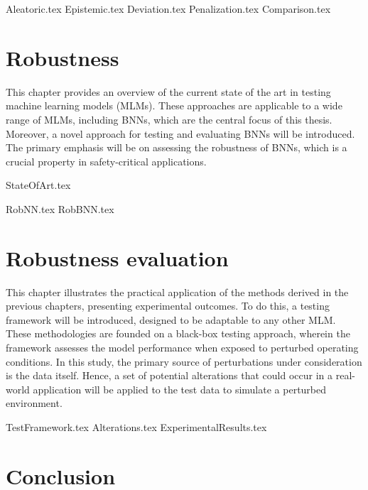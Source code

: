 \documentclass[
	12pt,
	a4paper,
	cleardoublepage=empty,
	headings=twolinechapter,
	numbers=autoenddot,
]{scrbook}
\begin{document}
	{Aleatoric.tex}
	{Epistemic.tex}
	{Deviation.tex}
	{Penalization.tex}
	{Comparison.tex}
	
	\chapter{Robustness}\label{chap:c4}
	
	This chapter provides an overview of the current state of the art in testing machine learning models (MLMs). These approaches are applicable to a wide range of MLMs, including BNNs, which are the central focus of this thesis. Moreover, a novel approach for testing and evaluating BNNs will be introduced. The primary emphasis will be on assessing the robustness of BNNs, which is a crucial property in safety-critical applications.
	
	{StateOfArt.tex}
	
	{RobNN.tex}
	{RobBNN.tex}
	
	\chapter{Robustness evaluation}\label{chap:c5}
	
	This chapter illustrates the practical application of the methods derived in the previous chapters, presenting experimental outcomes. To do this, a testing framework will be introduced, designed to be adaptable to any other MLM. These methodologies are founded on a black-box testing approach, wherein the framework assesses the model performance when exposed to perturbed operating conditions. In this study, the primary source of perturbations under consideration is the data itself. Hence, a set of potential alterations that could occur in a real-world application will be applied to the test data to simulate a perturbed environment.
	
	{TestFramework.tex}
	{Alterations.tex}
	{ExperimentalResults.tex}
	
	\chapter{Conclusion}
	
\end{document}
